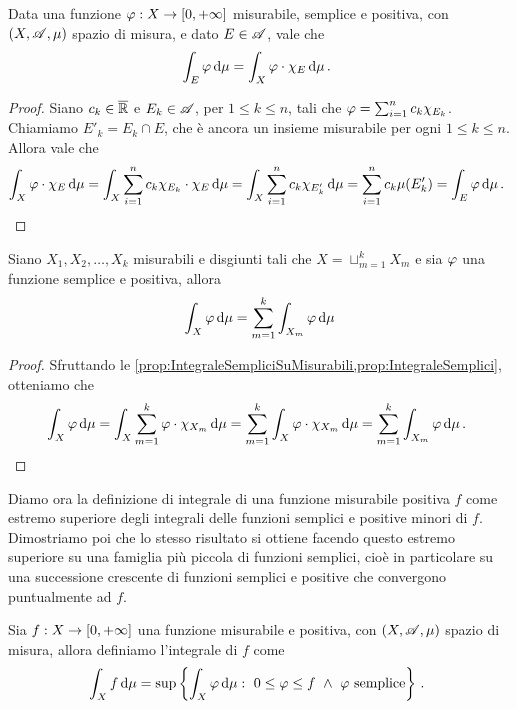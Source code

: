 \begin{proposition}\label{prop:IntegraleSempliciSuMisurabili}
	Data una funzione $\varphi:X\to[0,+\infty]$ misurabile, semplice e positiva, con $(X,\mathscr A,\mu)$ spazio di misura, e dato $E\in\mathscr A$, vale che
	\begin{equation*}
		\int_E \varphi\,\mathrm d\mu=\int_X \varphi \cdot \chi_E \,\mathrm d\mu\, \text{. }
	\end{equation*}
\end{proposition}
\begin{proof}
	Siano $c_k\in\overline{\mathbb R}$ e $E_k\in\mathscr A$, per $1\le k\le n$, tali che $\varphi=\sum_{i=1}^nc_k\chi_{E_k}$. Chiamiamo $E'_k=E_k\cap E$, che è ancora un insieme misurabile per ogni $1\le k\le n$. Allora vale che
	\begin{equation*}
		\int_X \varphi \cdot \chi_E \,\mathrm d\mu=\int_X \sum_{i=1}^nc_k\chi_{E_k}\cdot \chi_E \,\mathrm d\mu=\int_X \sum_{i=1}^nc_k\chi_{E'_k} \,\mathrm d\mu = \sum_{i=1}^n c_k \mu(E'_k)=\int_E \varphi\,\mathrm d\mu \, \text{. }
	\end{equation*}
\end{proof}

\begin{corollary}\label{cor:IntegraleSempliciSpezzato}
	Siano $X_1,X_2,\dots,X_k$ misurabili e disgiunti tali che $X=\sqcup_{m=1}^kX_m$ e sia $\varphi$ una funzione semplice e positiva, allora
	\begin{equation*}
		\int_X \varphi \,\mathrm d \mu=\sum_{m=1}^k \int_{X_m}\varphi\,\mathrm d \mu
	\end{equation*}
\end{corollary}
\begin{proof}
	Sfruttando le \cref{prop:IntegraleSempliciSuMisurabili,prop:IntegraleSemplici}, otteniamo che
	\begin{equation*}
		\int_X \varphi \,\mathrm d \mu=\int_X\sum_{m=1}^k\varphi\cdot \chi_{X_m}\,\mathrm d\mu=\sum_{m=1}^k\int_X \varphi\cdot \chi_{X_m}\,\mathrm d\mu=\sum_{m=1}^k \int_{X_m}\varphi\,\mathrm d \mu\, \text{. }
	\end{equation*}
\end{proof}

Diamo ora la definizione di integrale di una funzione misurabile positiva $f$ come estremo superiore degli integrali delle funzioni semplici e positive minori di $f$. Dimostriamo poi che lo stesso risultato si ottiene facendo questo estremo superiore su una famiglia più piccola di funzioni semplici, cioè in particolare su una successione crescente di funzioni semplici e positive che convergono puntualmente ad $f$.

\begin{definition}\label{def:IntegralePositive}
	Sia $f:X\to[0,+\infty]$ una funzione misurabile e positiva, con $(X,\mathscr A,\mu)$ spazio di misura, allora definiamo l'integrale di $f$ come
	\begin{equation*}
		\int_Xf\de\mu=\sup\left\{\int_X\simp\de \mu:\ 0\le \simp\le f\ \wedge\ \simp \text{ semplice}\right\}\punto
	\end{equation*}
\end{definition}

